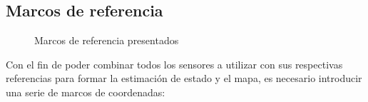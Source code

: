 \subsection{Marcos de referencia}

\begin{figure}
    \centering
    \qquad
    \caption{Marcos de referencia presentados}
    \label{fig:coordinateframes}
\end{figure}
Con el fin de poder combinar todos los sensores a utilizar con sus respectivas referencias para formar la estimación de estado y el mapa, es necesario introducir una serie de marcos de coordenadas:
